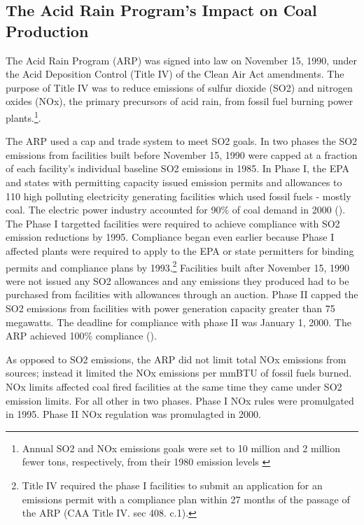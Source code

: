 \documentclass{article}
\begin{document}






\subsection{The Acid Rain Program's Impact on Coal Production}

The Acid Rain Program (ARP) was signed into law on November 15, 1990, under the Acid Deposition Control (Title IV) of the Clean Air Act amendments. The purpose of Title IV was to reduce emissions of sulfur dioxide (SO2) and nitrogen oxides (NOx), the primary precursors of acid rain, from fossil fuel burning power plants.\footnote{Annual SO2 and NOx emissions goals were set to 10 million and 2 million fewer tons, respectively, from their 1980 emission levels \cite{lattanzio2022clean}}. 

The ARP used a cap and trade system to meet SO2 goals. In two phases the SO2 emissions from facilities built before November 15, 1990 were capped at a fraction of each facility's individual baseline SO2 emissions in 1985. In Phase I, the EPA and states with permitting capacity issued emission permits and allowances to 110 high polluting electricity generating facilities which used fossil fuels - mostly coal. The electric power industry accounted for 90\% of coal demand in 2000 (\cite{freme2000us}). The Phase I targetted facilities were required to achieve compliance with SO2 emission reductions by 1995. Compliance began even earlier because Phase I affected plants were required to apply to the EPA or state permitters for binding permits and compliance plans by 1993.\footnote{Title IV required the phase I facilities to submit an application for an emissions permit with a compliance plan within 27 months of the passage of the ARP (CAA Title IV. sec 408. c.1).} Facilities built after November 15, 1990 were not issued any SO2 allowances and any emissions they produced had to be purchased from facilities with allowances through an auction. Phase II capped the SO2 emissions from facilities with power generation capacity greater than 75 megawatts. The deadline for compliance with phase II was January 1, 2000. The ARP achieved 100\% compliance (\cite{lattanzio2022clean}). 

As opposed to SO2 emissions, the ARP did not limit total NOx emissions from sources; instead it limited the NOx emissions per mmBTU of fossil fuels burned.
NOx limits affected coal fired facilities at the same time they came under SO2 emission limits. For all other in two phases. Phase I NOx rules were promulgated in 1995. Phase II NOx regulation was promulagted in 2000.
\end{document}
